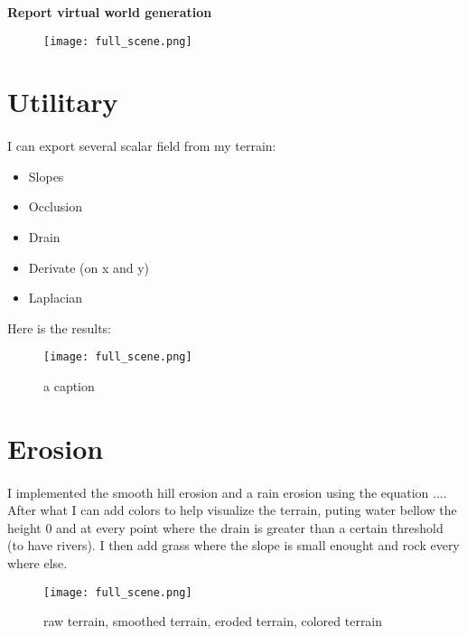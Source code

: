 \documentclass[a4paper,12pt]{article}
\date{\today}
\begin{document}
\pagestyle{fancy}
\begin{center}
\textbf{\huge Report virtual world generation}
\end{center}

\pagestyle{fancy}

\begin{figure}[!h]
  \centering
  \texttt{[image: full\_scene.png]}{}
\end{figure}

\section*{Utilitary}

\paragraph{} I can export several scalar field from my terrain:
\begin{itemize}
	\item Slopes
	\item Occlusion
	\item Drain
	\item Derivate (on x and y)
	\item Laplacian
\end{itemize}

Here is the results:
\begin{figure}[!h]
  \centering
  \texttt{[image: full\_scene.png]}{}
  \caption{a caption}
\end{figure}

\section*{Erosion}

\paragraph{} I implemented the smooth hill erosion and a rain erosion using the equation $...$. After what I can add colors to help visualize the terrain, puting water bellow the height $0$ and at every point where the drain is greater than a certain threshold (to have rivers). I then add grass where the slope is small enought and rock every where else.
\begin{figure}[!h]
  \centering
  \texttt{[image: full\_scene.png]}{}
  \caption{raw terrain, smoothed terrain, eroded terrain, colored terrain}
\end{figure}
\end{document}
